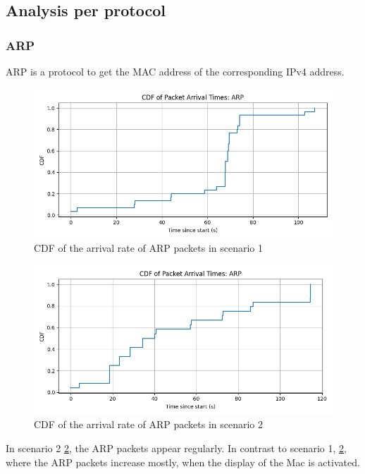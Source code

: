 \documentclass[sigconf,nonacm]{acmart}
\begin{document}
\subsection{Analysis per protocol}

\subsubsection{ARP}
\label{sec:arp}

ARP is a protocol to get the MAC address of the corresponding IPv4 address. 
\begin{figure}[htbp]
    \centering
    \includegraphics[width=\columnwidth]{images/part2/idle/CDF_ARP.png}
    \caption{CDF of the arrival rate of ARP packets in scenario 1}
    \label{fig:cdf_total_protocols_idle}
\end{figure}

\begin{figure}[htbp]
    \centering
    \includegraphics[width=\columnwidth]{images/part2/active use/CDF_ARP.png}
    \caption{CDF of the arrival rate of ARP packets in scenario 2}
    \label{fig:cdf_arp_a}
\end{figure}
In scenario 2 \cref{fig:cdf_arp_a}, the ARP packets appear regularly. 
In contrast to scenario 1, \cref{fig:cdf_arp_a}, where the ARP packets increase mostly, when the display of the Mac is activated.
\end{document}
